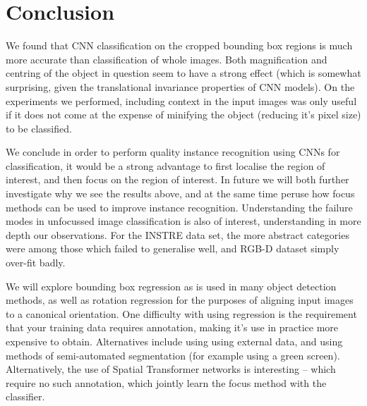 \section{Conclusion}

We found that CNN classification on the cropped bounding box regions is much more accurate than classification of whole images. Both magnification and centring of the object in question seem to have a strong effect (which is somewhat surprising, given the translational invariance properties of CNN models). On the experiments we performed, including context in the input images was only useful if it does not come at the expense of minifying the object (reducing it's pixel size) to be classified.

We conclude in order to perform quality instance recognition using CNNs for classification, it would be a strong advantage to first localise the region of interest, and then focus on the region of interest.  In future we will both further investigate why we see the results above, and at the same time peruse how focus methods can be used to improve instance recognition. Understanding the failure modes in unfocussed image classification is also of interest, understanding in more depth our observations. For the INSTRE data set, the more abstract categories were among those which failed to generalise well, and RGB-D dataset simply over-fit badly.

We will explore bounding box regression as is used in many object detection methods, as well as rotation regression for the purposes of aligning input images to a canonical orientation. One difficulty with using regression is the requirement that your training data requires annotation, making it's use in practice more expensive to obtain. Alternatives include using using external data, and using methods of semi-automated segmentation (for example using a green screen). Alternatively, the use of Spatial Transformer networks is interesting -- which require no such annotation, which jointly learn the focus method with the classifier.





